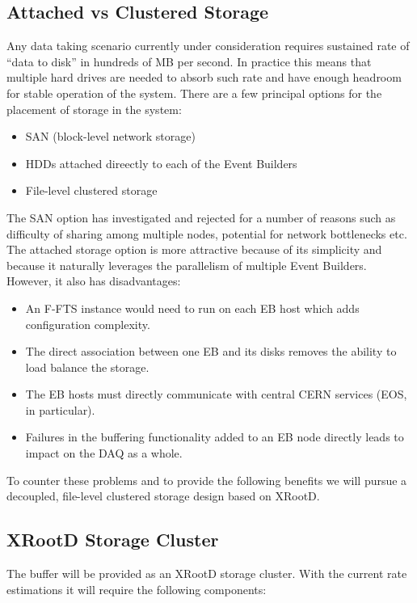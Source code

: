 \documentclass[pdftex,12pt,letter]{article}
\newcommand{\xrd}{XRootD\xspace}
\begin{document}
\subsection{Attached vs Clustered Storage}
Any data taking scenario currently under consideration requires sustained rate
of ``data to disk'' in hundreds of MB per second. In practice this means that
multiple hard drives are needed to absorb such rate and have enough headroom
for stable operation of the system.
There are a few principal options for the placement of storage in the system:
\begin{itemize}
\item SAN (block-level network storage)
\item HDDs attached direectly to each of the Event Builders
\item File-level clustered storage
\end{itemize}

\noindent The SAN option has investigated and rejected for a number of reasons such as difficulty of sharing among multiple
nodes, potential for network bottlenecks etc. The attached storage option is more attractive because of its simplicity and because it
naturally leverages the parallelism of multiple Event Builders.
However, it also has disadvantages:
\begin{itemize}
\item An F-FTS instance would need to run on each EB host which adds configuration complexity.
\item The direct association between one EB and its disks removes the ability to load balance the storage.
\item The EB hosts must directly communicate with central CERN services (EOS, in particular).
\item Failures in the buffering functionality added to an EB node directly leads to impact on the DAQ as a whole.
\end{itemize}

To counter these problems and to provide the following
benefits we will pursue a decoupled, file-level clustered storage
design based on \xrd\cite{xrootd}.  

\subsection{\xrd Storage Cluster}

The buffer will be provided as an \xrd storage cluster. With the
current rate estimations it will require the following components:
\end{document}
